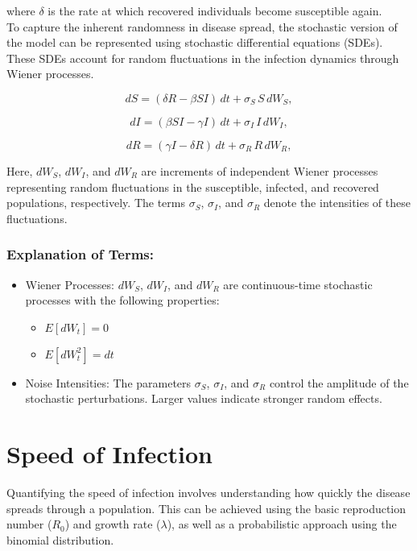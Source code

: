 where $\delta$ is the rate at which recovered individuals become susceptible again.\\

\noindent
To capture the inherent randomness in disease spread, the stochastic version of the model can be represented using stochastic differential equations (SDEs). These SDEs account for random fluctuations in the infection dynamics through Wiener processes.

\begin{equation}
dS = \left(\delta R - \beta SI\right) \, dt + \sigma_S \, S \, dW_S,
\label{equation:3.4}
\end{equation}

\begin{equation}
dI = \left(\beta SI - \gamma I\right) \, dt + \sigma_I \, I \, dW_I,
\label{equation:3.5}
\end{equation}

\begin{equation}
dR = \left(\gamma I - \delta R\right) \, dt + \sigma_R \, R \, dW_R,
\label{equation:3.6}
\end{equation}

\noindent
Here, \(dW_S\), \(dW_I\), and \(dW_R\) are increments of independent Wiener processes representing random fluctuations in the susceptible, infected, and recovered populations, respectively. The terms \(\sigma_S\), \(\sigma_I\), and \(\sigma_R\) denote the intensities of these fluctuations.

\subsubsection*{Explanation of Terms:}
\begin{itemize}
    \item Wiener Processes: \(dW_S\), \(dW_I\), and \(dW_R\) are continuous-time stochastic processes with the following properties:
    \begin{itemize}
        \item \(E[dW_t] = 0\)
        \item \(E[dW_t^2] = dt\)
    \end{itemize}
    \item Noise Intensities: The parameters \(\sigma_S\), \(\sigma_I\), and \(\sigma_R\) control the amplitude of the stochastic perturbations. Larger values indicate stronger random effects.
\end{itemize}

\section{Speed of Infection}
Quantifying the speed of infection involves understanding how quickly the disease spreads through a population. This can be achieved using the basic reproduction number ($R_0$) and growth rate ($\lambda$), as well as a probabilistic approach using the binomial distribution.

